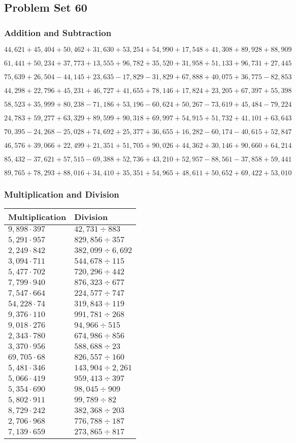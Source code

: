 \hypertarget{problem-set-60-3}{%
\subsection{Problem Set 60}\label{problem-set-60-3}}

\hypertarget{addition-and-subtraction-282}{%
\subsubsection{Addition and
Subtraction}\label{addition-and-subtraction-282}}

\(44,621+45,404+50,462+31,630+53,254+54,990+17,548+41,308+89,928+ 88,909\)

\(61,441+50,234+37,773+13,555+96,782+35,520+31,958+51,133+96,731+27,445\)

\(75,639+26,504-44,145+23,635-17,829-31,829+67,888+40,075+36,775-82,853\)

\(44,298+22,796+45,231+46,727+41,655+78,146+17,824+23,205+67,397+55,398\)

\(58,523+35,999+80,238-71,186+53,196-60,624+50,267-73,619+45,484-79,224\)

\(24,783+59,277+63,329+89,599+90,318+69,997+54,915+51,732+41,101+63,643\)

\(70,395-24,268-25,028+74,692+25,377+36,655+16,282-60,174-40,615+52,847\)

\(46,576+39,066+22,499+21,351+51,705+90,026+44,362+30,146+90,660+64,214\)

\(85,432-37,621+57,515-69,388+52,736+43,210+52,957-88,561-37,858+59,441\)

\(89,765+78,293+88,016+34,410+35,351+54,965+48,611+50,652+69,422+53,010\)

\hypertarget{multiplication-and-division-281}{%
\subsubsection{Multiplication and
Division}\label{multiplication-and-division-281}}

\begin{longtable}[]{@{}ll@{}}
\toprule
Multiplication & Division\tabularnewline
\midrule
\endhead
\(9,898\cdot397\) & \(42,731÷883\)\tabularnewline
\(5,291\cdot957\) & \(829,856÷357\)\tabularnewline
\(2,249\cdot842\) & \(382,099÷6,692\)\tabularnewline
\(3,094\cdot711\) & \(544,678÷115\)\tabularnewline
\(5,477\cdot702\) & \(720,296÷442\)\tabularnewline
\(7,799\cdot940\) & \(876,323÷677\)\tabularnewline
\(7,547\cdot664\) & \(224,577÷747\)\tabularnewline
\(54,228\cdot74\) & \(319,843÷119\)\tabularnewline
\(9,376\cdot110\) & \(991,781÷268\)\tabularnewline
\(9,018\cdot276\) & \(94,966÷515\)\tabularnewline
\(2,343\cdot780\) & \(674,986÷856\)\tabularnewline
\(3,370\cdot956\) & \(588,688÷23\)\tabularnewline
\(69,705\cdot68\) & \(826,557÷160\)\tabularnewline
\(5,481\cdot346\) & \(143,904÷2,261\)\tabularnewline
\(5,066\cdot419\) & \(959,413÷397\)\tabularnewline
\(5,354\cdot690\) & \(98,045÷909\)\tabularnewline
\(5,802\cdot911\) & \(99,789÷82\)\tabularnewline
\(8,729\cdot242\) & \(382,368÷203\)\tabularnewline
\(2,706\cdot968\) & \(776,788÷187\)\tabularnewline
\(7,139\cdot659\) & \(273,865÷817\)\tabularnewline
\bottomrule
\end{longtable}

